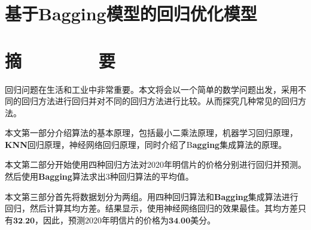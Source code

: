\section*{\heiti 基于Bagging模型的回归优化模型}
\section*{\heiti 摘\ \ \ \ \ \ \ \ 要}

回归问题在生活和工业中非常重要。本文将会以一个简单的数学问题出发，采用不同的回归方法进行回归并对不同的回归方法进行比较。从而探究几种常见的回归方法。

本文第一部分介绍算法的基本原理，包括最小二乘法原理，机器学习回归原理，\textbf{KNN}回归原理，神经网络回归原理，同时介绍了B\textbf{agging}集成算法的原理。

本文第二部分开始使用四种回归方法对2020年明信片的价格分别进行回归并预测。然后使用\textbf{Bagging}算法求出3种回归算法的平均值。

本文第三部分首先将数据划分为两组。用四种回归算法和\textbf{Bagging}集成算法进行回归，然后计算其均方差。结果显示，使用神经网络回归的效果最佳。其均方差只有$\textbf{32.20}$，因此，预测$2020$年明信片的价格为$\textbf{34.00}$美分。



\clearpage





